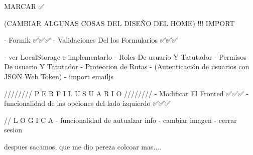 
MARCAR ✅

(CAMBIAR ALGUNAS COSAS DEL DISEÑO DEL HOME) !!! IMPORT 

    - Formik ✅✅✅
    - Validaciones Del los Formularios ✅✅✅

    - ver LocalStorage e implementarlo
    - Roles De usuario Y Tatutador 
    - Permisos De usuario Y Tatutador
    - Proteccion de Rutas
    - (Autenticación de usuarios con JSON Web Token)
    - import emailjs 



////////   P E R F I L   U S U A R I O   ////////  
    - Modificar El Fronted ✅✅✅
    - funcionalidad de las opciones del lado izquierdo ✅✅✅

    // L O G I C A
    - funcionalidad de autualzar info 
    - cambiar imagen
    - cerrar sesion 

despues sacamos, que me dio pereza colcoar mas....


